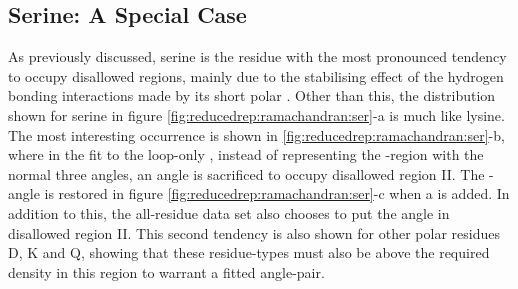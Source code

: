 \subsection{Serine: A Special Case}

As previously discussed, serine is the residue with the most pronounced tendency to occupy disallowed regions, mainly due to the stabilising effect of the hydrogen bonding interactions made by its short polar \sidechain. Other than this, the distribution shown for serine in figure \ref{fig:reducedrep:ramachandran:ser}-a is much like lysine. The most interesting occurrence is shown in 
\ref{fig:reducedrep:ramachandran:ser}-b, where in the fit to the loop-only \dataset, instead of representing the \be-region with the normal three angles, an angle is sacrificed to occupy disallowed region II. The \be-angle is restored in figure \ref{fig:reducedrep:ramachandran:ser}-c when a  is added. In addition to this, the all-residue data set also chooses to put the  angle in disallowed region II. This second tendency is also shown for other  polar residues D, K and Q, showing that these residue-types must also be above the required density in this region to warrant a fitted angle-pair.



